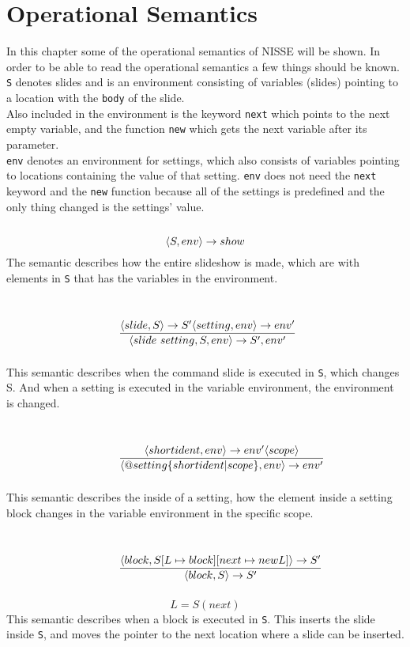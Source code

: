 \chapter{Operational Semantics}
In this chapter some of the operational semantics of NISSE will be shown. In order to be able to read the operational semantics a few things should be known. \\
\texttt{S} denotes slides and is an environment consisting of variables (slides) pointing to a location with the \texttt{body} of the slide. \\
Also included in the environment is the keyword \texttt{next} which points to the next empty variable, and the function \texttt{new} which gets the next variable after its parameter. \\
\texttt{env} denotes an environment for settings, which also consists of variables pointing to locations containing the value of that setting. \texttt{env} does not need the \texttt{next} keyword and the \texttt{new} function because all of the settings is predefined and the only thing changed is the settings' value.
\\ \\
\noindent{$[slideshow]$}
\[ \langle S, env \rangle \rightarrow show \]
The semantic describes how the entire slideshow is made, which are with elements in \texttt{S} that has the variables in the environment.
\\ \\ %
\noindent{$[specification]$}
\[ \condinfrule{\langle slide, S \rangle \ra S' \langle setting, env \rangle \ra env'} { \langle slide~setting, S, env \rangle \ra S', env'}{} \]
This semantic describes when the command slide is executed in \texttt{S}, which changes S. And when a setting is executed in the variable environment, the environment is changed.
\\ \\
\noindent{$[setting]$}
\[ \condinfrule{\langle shortident, env \rangle \ra env' \langle scope \rangle} { \langle @ setting \{ shortident | scope \}, env \rangle \ra env'}{} \]
This semantic describes the inside of a setting, how the element inside a setting block changes in the variable environment in the specific scope.
\\ \\
\noindent{$[slide]$}
\[ \condinfrule{\langle block, S[L \mapsto block] [next \mapsto new L] \rangle \ra S'} { \langle block, S \rangle \ra S'}{} \]
\[ L = S(next)\]
This semantic describes when a block is executed in \texttt{S}. This inserts the slide inside \texttt{S}, and moves the pointer to the next location where a slide can be inserted.
